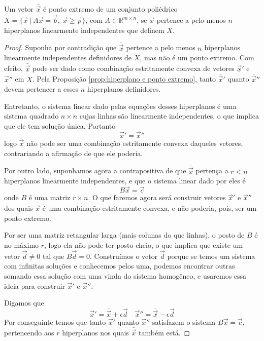 \begin{thm:ponto extremo}
	\label{thm:ponto extremo}
	Um vetor $\bar{\vec{x}}$ é ponto extremo de um conjunto poliédrico
	$X = \{\vec{x}\ |\ A\vec{x} = \vec{b},\ \vec{x} \geq \vec{p}\}$, com
	$A \in \mathbb{R}^{m \times n}$, se $\bar{\vec{x}}$ pertence a pelo menos $n$
	hiperplanos linearmente independentes que definem $X$.

	\begin{proof}
		Suponha por contradição que $\bar{\vec{x}}$ pertence a pelo menos $n$
		hiperplanos linearmente independentes definidores de $X$, mas não é um
		ponto extremo. Com efeito, $\bar{\vec{x}}$ pode ser dado como combinação
		estritamente convexa de vetores $\vec{x}'$ e $\vec{x}''$ em $X$.
		Pela Proposição \ref{prop:hiperplano e ponto extremo}, tanto
		$\bar{\vec{x}}'$ quanto $\bar{\vec{x}}''$ devem pertencer a esses $n$
		hiperplanos definidores.

		Entretanto, o sistema linear dado pelas equações desses hiperplanos é uma sistema quadrado $n \times n$ cujas linhas são linearmente independentes, o que implica que ele tem solução única. Portanto \[\vec{x}' = \vec{x}''\]logo $\bar{\vec{x}}$ não pode ser uma combinação estritamente convexa daqueles vetores, contrariando a afirmação de que ele poderia.

		Por outro lado, suponhamos agora a contrapositiva de que $\bar{\vec{x}}$ pertença a $r < n$ hiperplanos linearmente independentes, e que o sistema linear dado por eles é \[B\vec{x} = \vec{c}\]onde $B$ é uma matriz $r \times n$. O que faremos agora será construir vetores $\vec{x}'$ e $\vec{x}''$ dos quais $\bar{\vec{x}}$ é uma combinação estritamente convexa, e não poderia, pois, ser um ponto extremo.

		Por ser uma matriz retangular larga (mais colunas do que linhas), o posto de $B$ é no máximo $r$, logo ela não pode ter posto cheio, o que implica que existe um vetor $\vec{d} \neq 0$ tal que $B \vec{d} = 0$. Construímos o vetor $\vec{d}$ porque se temos um sistema com infinitas soluções e conhecemos pelos uma, podemos encontrar outras somando essa solução com uma vinda do sistema homogêneo, e usaremos essa ideia para construir $\vec{x}'$ e $\vec{x}''$.

		Digamos que
		\begin{equation*}
			\vec{x}' = \bar{\vec{x}} + \epsilon \vec{d}
			\quad
			\vec{x}'' = \bar{\vec{x}} - \epsilon \vec{d}
		\end{equation*}
		Por conseguinte temos que tanto $\vec{x}'$ quanto $\vec{x}''$ satisfazem o sistema $B\vec{x} = \vec{c}$, pertencendo aos $r$ hiperplanos nos quais $\bar{\vec{x}}$ também está.


\end{proof}
\end{thm:ponto extremo}
